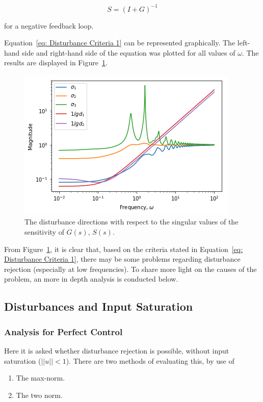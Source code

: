 \begin{equation}
	S = (I + G)^{-1}
\end{equation}

for a negative feedback loop.

Equation~\ref{eq: Disturbance Criteria 1} can be represented graphically. The left-hand side and right-hand side of the equation was plotted for all values of $\omega$. The results are displayed in Figure~\ref{fig:disturbance-analysis-1}.

\begin{figure}[H]
	\centering
	\includegraphics[width=0.7\linewidth]{"Figures/Disturbance Analysis 1"}
	\caption{The disturbance directions with respect to the singular values of the sensitivity of $G(s)$, $S(s)$.}
	\label{fig:disturbance-analysis-1}
\end{figure}

From Figure~\ref{fig:disturbance-analysis-1}, it is clear that, based on the criteria stated in Equation~\ref{eq: Disturbance Criteria 1}, there may be some problems regarding disturbance rejection (especially at low frequencies). To share more light on the causes of the problem, an more in depth analysis is conducted below.

\subsection{Disturbances and Input Saturation}

\subsubsection{Analysis for Perfect Control}
Here it is asked whether disturbance rejection is possible, without input saturation \newline($||u||<1$). There are two methods of evaluating this, by use of

\begin{enumerate}
	\item The max-norm.
	\item The two norm.
\end{enumerate}

